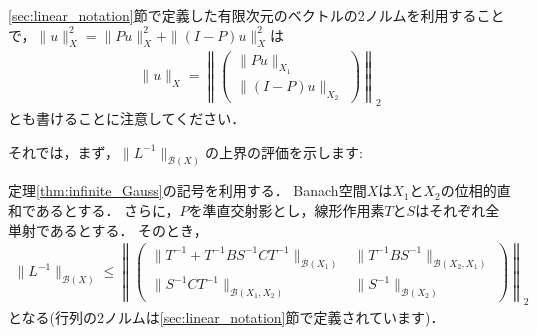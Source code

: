 \ref{sec:linear_notation}節で定義した有限次元のベクトルの2ノルムを利用することで，$\| u \|_{X}^2 = \| P u \|_{X}^2 + \| (I - P) u \|_{X}^2$は
	\begin{align*}
		\| u \|_{X} = \left\| \left( \begin{array}{c}
		 \| P u \|_{X_1} \\
		 \| (I - P) u \|_{X_2}
		 \end{array} \right) \right\|_2
	\end{align*}
とも書けることに注意してください．

それでは，まず，$\| L^{-1} \|_{{\mathcal B}(X)}$の上界の評価を示します:

\begin{Thm} \label{thm:inverse_norm_estimate}
定理\ref{thm:infinite_Gauss}の記号を利用する．
Banach空間$X$は$X_1$と$X_2$の位相的直和であるとする．
さらに，$P$を準直交射影とし，線形作用素$T$と$S$はそれぞれ全単射であるとする．
そのとき，
	\begin{align*}
		\| L^{-1} \|_{{\mathcal B}(X)} \le \left\| \left( \begin{array}{cc}
		\| T^{-1} + T^{-1} B S^{-1} C T^{-1} \|_{{\mathcal B}(X_1)} & \| T^{-1} B S^{-1} \|_{{\mathcal B}(X_2, X_1)} \\
		\| S^{-1} C T^{-1} \|_{{\mathcal B}(X_1, X_2)} & \| S^{-1} \|_{{\mathcal B}(X_2)}
	\end{array} \right) \right\|_2
	\end{align*}
となる(行列の2ノルムは\ref{sec:linear_notation}節で定義されています)．
\end{Thm}

